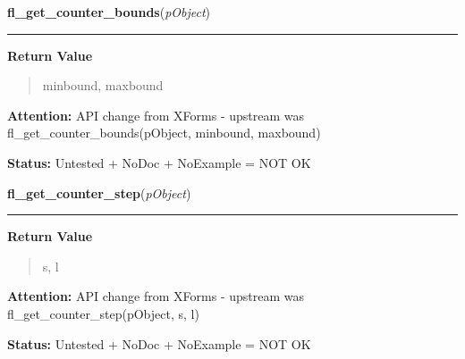 \hspace{.8\funcindent}\begin{boxedminipage}{\funcwidth}

    \raggedright \textbf{fl\_get\_counter\_bounds}(\textit{pObject})

    \vspace{-1.5ex}

    \rule{\textwidth}{0.5\fboxrule}
\setlength{\parskip}{2ex}
\setlength{\parskip}{1ex}
      \textbf{Return Value}
    \vspace{-1ex}

      \begin{quote}
      minbound, maxbound

      \end{quote}

\textbf{Attention:} API change from XForms - upstream was fl\_get\_counter\_bounds(pObject, 
minbound, maxbound)



\textbf{Status:} Untested + NoDoc + NoExample = NOT OK



    \end{boxedminipage}

    \label{xformslib:library:fl_get_counter_step}

    \vspace{0.5ex}

\hspace{.8\funcindent}\begin{boxedminipage}{\funcwidth}

    \raggedright \textbf{fl\_get\_counter\_step}(\textit{pObject})

    \vspace{-1.5ex}

    \rule{\textwidth}{0.5\fboxrule}
\setlength{\parskip}{2ex}
\setlength{\parskip}{1ex}
      \textbf{Return Value}
    \vspace{-1ex}

      \begin{quote}
      s, l

      \end{quote}

\textbf{Attention:} API change from XForms - upstream was fl\_get\_counter\_step(pObject, s, l)



\textbf{Status:} Untested + NoDoc + NoExample = NOT OK



    \end{boxedminipage}

